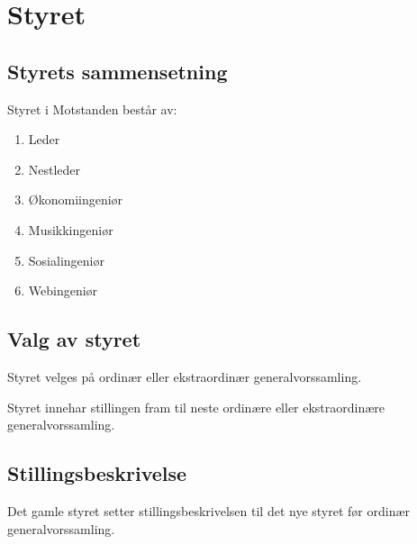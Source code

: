 \section{Styret}
    \subsection{Styrets sammensetning}
        \begin{statute}
            Styret i Motstanden består av:
            \begin{enumerate}[font = \bfseries]
                \item Leder
                \item Nestleder
                \item Økonomiingeniør
                \item Musikkingeniør
                \item Sosialingeniør
                \item Webingeniør
            \end{enumerate}
        \end{statute}

    \subsection{Valg av styret}
        \begin{statute}
            Styret velges på ordinær eller ekstraordinær generalvorssamling.
        \end{statute}
        \begin{statute}
            Styret innehar stillingen fram til neste ordinære eller ekstraordinære generalvorssamling.
        \end{statute}
        
    \subsection{Stillingsbeskrivelse}
        \begin{statute}
            Det gamle styret setter stillingsbeskrivelsen til det nye styret før ordinær generalvorssamling.
        \end{statute}
      